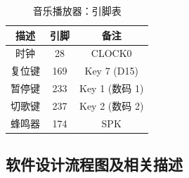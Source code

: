 \begin{table}[H]
    \centering
    \begin{tabular}{|c|c|c|}
        \hline
        描述 & 引脚 & 备注 \\
        \hline
        时钟 & 28 & CLOCK0 \\
        \hline
        复位键 & 169 & Key 7 (D15) \\
        \hline
        暂停键 & 233 & Key 1 (数码 1) \\
        \hline
        切歌键 & 237 & Key 2 (数码 2) \\
        \hline
        蜂鸣器 & 174 & SPK \\
        \hline
    \end{tabular}
    \caption{音乐播放器：引脚表}
    \label{tab:pin7}
\end{table}

\subsection{软件设计流程图及相关描述}

